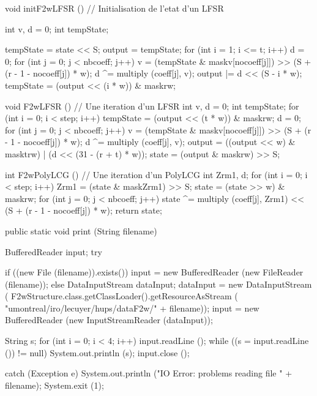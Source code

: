 \begin{code} \begin{hide}

   void initF2wLFSR ()     // Initialisation de l'etat d'un LFSR
   {
      int v, d = 0;
      int tempState;

      tempState = state << S;
      output = tempState;
      for (int i = 1; i <= t; i++) {
         d = 0;
         for (int j = 0; j < nbcoeff; j++) {
            v = (tempState & maskv[nocoeff[j]]) >>
                 (S + (r - 1 - nocoeff[j]) * w);
            d ^= multiply (coeff[j], v);
         }
         output |= d << (S - i * w);
         tempState = (output << (i * w)) & maskrw;
      }
   }


   void F2wLFSR ()       // Une iteration d'un LFSR
   {
      int v, d = 0;
      int tempState;
      for (int i = 0; i < step; i++) {
         tempState = (output << (t * w)) & maskrw;
         d = 0;
         for (int j = 0; j < nbcoeff; j++) {
            v = (tempState & maskv[nocoeff[j]]) >>
                (S + (r - 1 - nocoeff[j]) * w);
            d ^= multiply (coeff[j], v);
         }
         output = ((output << w) & masktrw) |
                  (d << (31 - (r + t) * w));
      }
      state = (output & maskrw) >> S;
   }


   int F2wPolyLCG ()    // Une iteration d'un PolyLCG
   {
      int Zrm1, d;
      for (int i = 0; i < step; i++) {
         Zrm1 = (state & maskZrm1) >> S;
         state = (state >> w) & maskrw;
         for (int j = 0; j < nbcoeff; j++)
            state ^=
               multiply (coeff[j], Zrm1) << (S + (r - 1 - nocoeff[j]) * w);
      }
      return state;
   }\end{hide}

   public static void print (String filename)\begin{hide}
   {
     BufferedReader input;
     try {
       if ((new File (filename)).exists()) {
          input = new BufferedReader (new FileReader (filename));
       } else {
          DataInputStream dataInput;
          dataInput = new DataInputStream (
             F2wStructure.class.getClassLoader().getResourceAsStream (
                 "umontreal/iro/lecuyer/hups/dataF2w/" + filename));
          input = new BufferedReader (new InputStreamReader (dataInput));
       }

     String s;
     for (int i = 0; i < 4; i++)
        input.readLine ();
     while ((s = input.readLine ()) != null)
        System.out.println (s);
     input.close ();

     } catch (Exception e) {
       System.out.println ("IO Error: problems reading file " + filename);
       System.exit (1);
     }
   }\end{hide}
\end{code}
